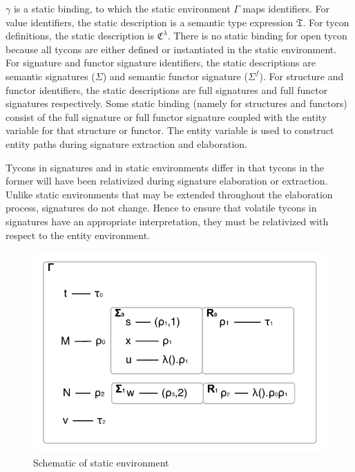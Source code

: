 $\gamma$ is a static binding, to which the static environment $\Gamma$ maps identifiers. For value identifiers, the static description is a semantic type expression $\mathfrak{T}$. For tycon definitions, the static description is $\mathfrak{C}^\lambda$. There is no static binding for open tycon because all tycons are either defined or instantiated in the static environment.  For signature and functor signature identifiers, the static descriptions are semantic signatures ($\Sigma$) and semantic functor signature ($\Sigma^f$). For structure and functor identifiers, the static descriptions are full signatures and full functor signatures respectively. Some static binding (namely for structures and functors) consist of the full signature or full functor signature coupled with the entity variable for that structure or functor. The entity variable is used to construct entity paths during signature extraction and elaboration. 

Tycons in signatures and in static environments differ in that tycons
in the former will have been relativized during signature elaboration
or extraction. Unlike static environments that may be extended
throughout the elaboration process, signatures do not change. Hence to
ensure that volatile tycons in signatures have an appropriate
interpretation, they must be relativized with respect to the entity
environment. 

\begin{figure}
\begin{center}
\includegraphics{figs/fig-staticenv-sigs}
\end{center}
\caption{Schematic of static environment}
\label{fig:staticenv-sigs}
\end{figure}

